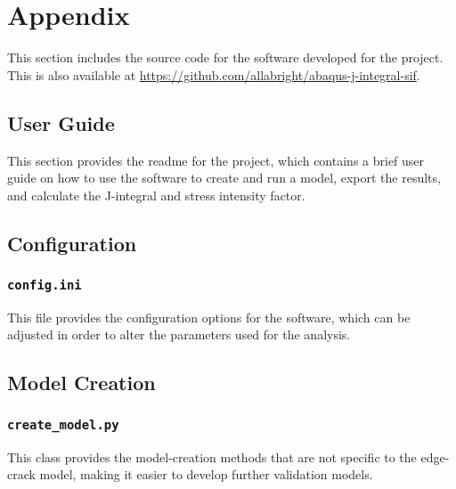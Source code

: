 \chapter{Appendix}\label{sec:appendix}

This section includes the source code for the software developed for the project. This is also available at \href{https://github.com/allabright/abaqus-j-integral-sif}{https://github.com/allabright/abaqus-j-integral-sif}.

\newpage
\section{User Guide}

This section provides the readme for the project, which contains a brief user guide on how to use the software to create and run a model, export the results, and calculate the J-integral and stress intensity factor.



\newpage
\section{Configuration}

\subsection{\texttt{config.ini}}

This file provides the configuration options for the software, which can be adjusted in order to alter the parameters used for the analysis.



\newpage
\section{Model Creation}

\subsection{\texttt{create\_model.py}}

This class provides the model-creation methods that are not specific to the edge-crack model, making it easier to develop further validation models.



